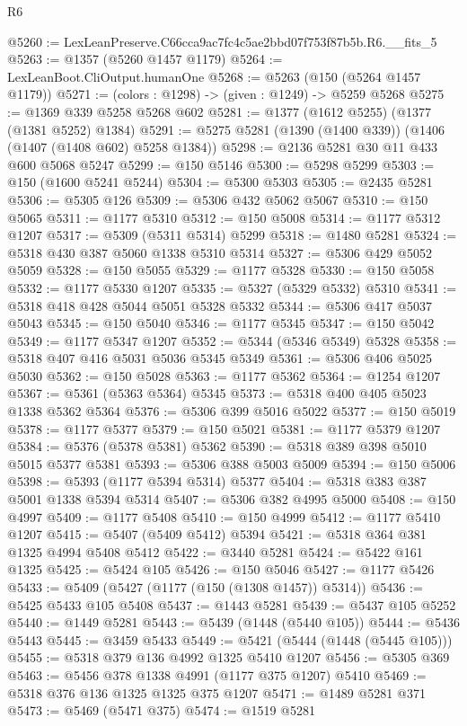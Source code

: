 \begin{lexlean}{R6}
\begin{coremodule}
@5260 := LexLeanPreserve.C66cca9ac7fc4c5ae2bbd07f753f87b5b.R6.__fits_5
@5263 := @1357 (@5260 @1457 @1179)
@5264 := LexLeanBoot.CliOutput.humanOne
@5268 := @5263 (@150 (@5264 @1457 @1179))
@5271 := (colors : @1298) -> (given : @1249) -> @5259 @5268
@5275 := @1369 @339 @5258 @5268 @602
@5281 := @1377 (@1612 @5255) (@1377 (@1381 @5252) @1384)
@5291 := @5275 @5281 (@1390 (@1400 @339)) (@1406 (@1407 (@1408 @602) @5258 @1384))
@5298 := @2136 @5281 @30 @11 @433 @600 @5068 @5247
@5299 := @150 @5146
@5300 := @5298 @5299
@5303 := @150 (@1600 @5241 @5244)
@5304 := @5300 @5303
@5305 := @2435 @5281
@5306 := @5305 @126
@5309 := @5306 @432 @5062 @5067
@5310 := @150 @5065
@5311 := @1177 @5310
@5312 := @150 @5008
@5314 := @1177 @5312 @1207
@5317 := @5309 (@5311 @5314) @5299
@5318 := @1480 @5281
@5324 := @5318 @430 @387 @5060 @1338 @5310 @5314
@5327 := @5306 @429 @5052 @5059
@5328 := @150 @5055
@5329 := @1177 @5328
@5330 := @150 @5058
@5332 := @1177 @5330 @1207
@5335 := @5327 (@5329 @5332) @5310
@5341 := @5318 @418 @428 @5044 @5051 @5328 @5332
@5344 := @5306 @417 @5037 @5043
@5345 := @150 @5040
@5346 := @1177 @5345
@5347 := @150 @5042
@5349 := @1177 @5347 @1207
@5352 := @5344 (@5346 @5349) @5328
@5358 := @5318 @407 @416 @5031 @5036 @5345 @5349
@5361 := @5306 @406 @5025 @5030
@5362 := @150 @5028
@5363 := @1177 @5362
@5364 := @1254 @1207
@5367 := @5361 (@5363 @5364) @5345
@5373 := @5318 @400 @405 @5023 @1338 @5362 @5364
@5376 := @5306 @399 @5016 @5022
@5377 := @150 @5019
@5378 := @1177 @5377
@5379 := @150 @5021
@5381 := @1177 @5379 @1207
@5384 := @5376 (@5378 @5381) @5362
@5390 := @5318 @389 @398 @5010 @5015 @5377 @5381
@5393 := @5306 @388 @5003 @5009
@5394 := @150 @5006
@5398 := @5393 (@1177 @5394 @5314) @5377
@5404 := @5318 @383 @387 @5001 @1338 @5394 @5314
@5407 := @5306 @382 @4995 @5000
@5408 := @150 @4997
@5409 := @1177 @5408
@5410 := @150 @4999
@5412 := @1177 @5410 @1207
@5415 := @5407 (@5409 @5412) @5394
@5421 := @5318 @364 @381 @1325 @4994 @5408 @5412
@5422 := @3440 @5281
@5424 := @5422 @161 @1325
@5425 := @5424 @105
@5426 := @150 @5046
@5427 := @1177 @5426
@5433 := @5409 (@5427 (@1177 (@150 (@1308 @1457)) @5314))
@5436 := @5425 @5433 @105 @5408
@5437 := @1443 @5281
@5439 := @5437 @105 @5252
@5440 := @1449 @5281
@5443 := @5439 (@1448 (@5440 @105))
@5444 := @5436 @5443
@5445 := @3459 @5433
@5449 := @5421 (@5444 (@1448 (@5445 @105)))
@5455 := @5318 @379 @136 @4992 @1325 @5410 @1207
@5456 := @5305 @369
@5463 := @5456 @378 @1338 @4991 (@1177 @375 @1207) @5410
@5469 := @5318 @376 @136 @1325 @1325 @375 @1207
@5471 := @1489 @5281 @371
@5473 := @5469 (@5471 @375)
@5474 := @1519 @5281

\end{coremodule}
\end{lexlean}
